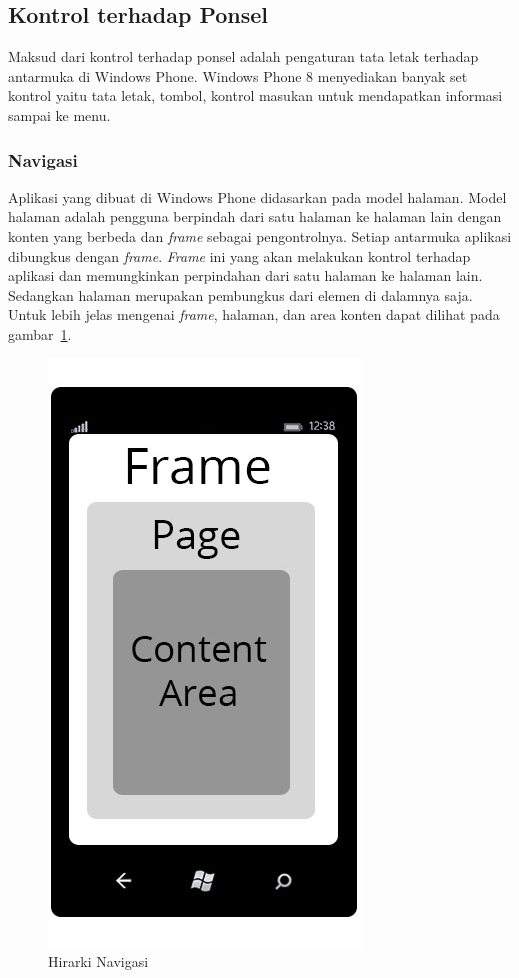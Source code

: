 \subsection{Kontrol terhadap Ponsel}
\label{subsec:Kontrol terhadap Ponsel}
\hspace{0.5cm} Maksud dari kontrol terhadap ponsel adalah pengaturan tata letak terhadap antarmuka di Windows Phone\cite{MSDN}. Windows Phone 8 menyediakan banyak set kontrol yaitu tata letak, tombol, kontrol masukan untuk mendapatkan informasi sampai ke menu. 

\subsubsection{Navigasi}
\label{subsubsec:Navigasi}
\hspace{0.5cm} Aplikasi yang dibuat di Windows Phone didasarkan pada model halaman. Model halaman adalah pengguna berpindah dari satu halaman ke halaman lain dengan konten yang berbeda dan \textit{frame} sebagai pengontrolnya. Setiap antarmuka aplikasi dibungkus dengan \textit{frame}. \textit{Frame} ini yang akan melakukan kontrol terhadap aplikasi dan memungkinkan perpindahan dari satu halaman ke halaman lain. Sedangkan halaman merupakan pembungkus dari elemen di dalamnya saja. Untuk lebih jelas mengenai \textit{frame}, halaman, dan area konten dapat dilihat pada gambar~\ref{fig:nav_hierarchy}.

\begin{figure}[h]
	\centering
		\includegraphics[scale=0.5]{Gambar/nav_hierarchy}
	\caption{Hirarki Navigasi}
	\label{fig:nav_hierarchy}
\end{figure}

